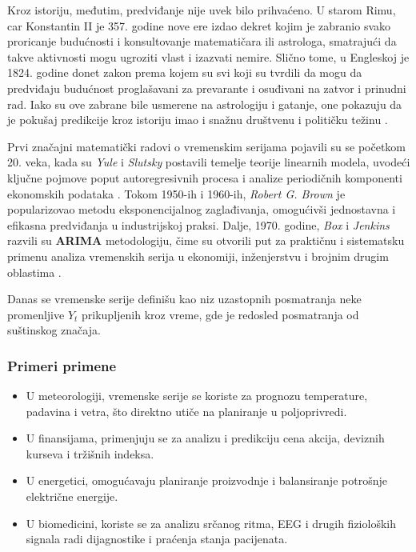 \documentclass[12pt]{article}
\begin{document}
Kroz istoriju, međutim, predviđanje nije uvek bilo prihvaćeno. U starom Rimu, car Konstantin II je 357. godine nove ere izdao dekret kojim je zabranio svako proricanje budućnosti i konsultovanje matematičara ili astrologa, smatrajući da takve aktivnosti mogu ugroziti vlast i izazvati nemire. Slično tome, u Engleskoj je 1824. godine donet zakon prema kojem su svi koji su tvrdili da mogu da predviđaju budućnost proglašavani za prevarante i osuđivani na zatvor i prinudni rad. Iako su ove zabrane bile usmerene na astrologiju i gatanje, one pokazuju da je pokušaj predikcije kroz istoriju imao i snažnu društvenu i političku težinu \cite{histlaw2025}.

Prvi značajni matematički radovi o vremenskim serijama pojavili su se početkom 20. veka, kada su \textit{Yule} i \textit{Slutsky} postavili temelje teorije linearnih modela, uvodeći ključne pojmove poput autoregresivnih procesa i analize periodičnih komponenti ekonomskih podataka \cite{yule1927, slutsky1937}. Tokom 1950-ih i 1960-ih, \textit{Robert G. Brown} je popularizovao metodu eksponencijalnog zaglađivanja, omogućivši jednostavna i efikasna predviđanja u industrijskoj praksi. Dalje, 1970. godine, \textit{Box} i \textit{Jenkins} razvili su \textbf{ARIMA} metodologiju, čime su otvorili put za praktičnu i sistematsku primenu analiza vremenskih serija u ekonomiji, inženjerstvu i brojnim drugim oblastima \cite{box1970}.

Danas se vremenske serije definišu kao niz uzastopnih posmatranja neke promenljive ${Y_t}$ prikupljenih kroz vreme, gde je redosled posmatranja od suštinskog značaja.

\subsubsection{Primeri primene}
\begin{itemize}
    \item U meteorologiji, vremenske serije se koriste za prognozu temperature, padavina i vetra, što direktno utiče na planiranje u poljoprivredi.
    \item U finansijama, primenjuju se za analizu i predikciju cena akcija, deviznih kurseva i tržišnih indeksa.
    \item U energetici, omogućavaju planiranje proizvodnje i balansiranje potrošnje električne energije.
    \item U biomedicini, koriste se za analizu srčanog ritma, EEG i drugih fizioloških signala radi dijagnostike i praćenja stanja pacijenata.
\end{itemize}
\end{document}
